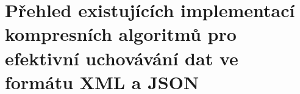 \chapter{Přehled existujících implementací kompresních algoritmů pro efektivní uchovávání dat ve formátu XML a JSON}